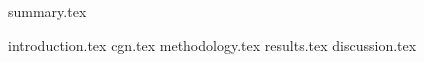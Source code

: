 {summary.tex}


{introduction.tex}
{cgn.tex}
{methodology.tex}
{results.tex}
{discussion.tex}












